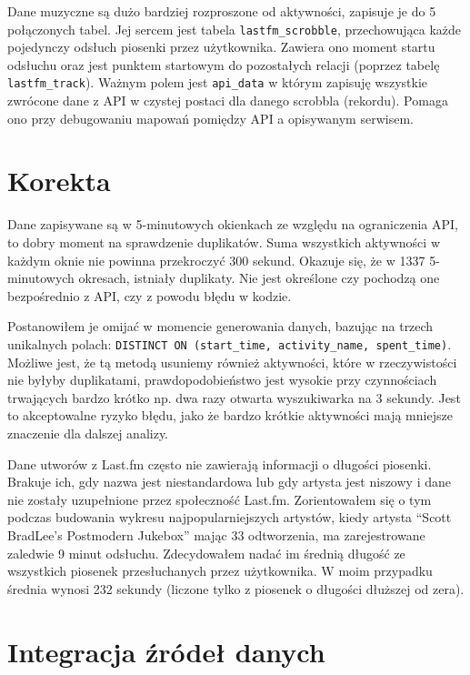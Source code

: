 \documentclass[brudnopis]{xmgr}
\begin{document}
    Dane muzyczne są dużo bardziej rozproszone od aktywności, zapisuje je do 5 połączonych tabel.
    Jej sercem jest tabela \verb|lastfm_scrobble|, przechowująca każde pojedynczy odsłuch piosenki przez użytkownika.
    Zawiera ono moment startu odsłuchu oraz jest punktem startowym do pozostałych relacji (poprzez tabelę \verb|lastfm_track|).
    Ważnym polem jest \verb|api_data| w którym zapisuję wszystkie zwrócone dane z API w czystej postaci dla danego scrobbla (rekordu).
    Pomaga ono przy debugowaniu mapowań pomiędzy API a opisywanym serwisem.

    \section{Korekta}

        Dane zapisywane są w 5-minutowych okienkach ze względu na ograniczenia API, to dobry moment na sprawdzenie duplikatów.
        Suma wszystkich aktywności w każdym oknie nie powinna przekroczyć 300 sekund.
        Okazuje się, że w 1337 5-minutowych okresach, istniały duplikaty.
        Nie jest określone czy pochodzą one bezpośrednio z API, czy z powodu błędu w kodzie.

        Postanowiłem je omijać w momencie generowania danych, bazując na trzech unikalnych polach:
        \verb|DISTINCT ON (start_time, activity_name, spent_time)|.
        Możliwe jest, że tą metodą usuniemy również aktywności, które w rzeczywistości nie byłyby duplikatami,
        prawdopodobieństwo jest wysokie przy czynnościach trwających bardzo krótko np. dwa razy otwarta wyszukiwarka na 3 sekundy.
        Jest to akceptowalne ryzyko błędu, jako że bardzo krótkie aktywności mają mniejsze znaczenie dla dalszej analizy.

        Dane utworów z Last.fm często nie zawierają informacji o długości piosenki.
        Brakuje ich, gdy nazwa jest niestandardowa lub gdy artysta jest niszowy i dane nie zostały uzupełnione przez społeczność Last.fm.
        Zorientowałem się o tym podczas budowania wykresu najpopularniejszych artystów,
        kiedy artysta ``Scott BradLee's Postmodern Jukebox'' mając 33 odtworzenia, ma zarejestrowane zaledwie 9 minut odsłuchu.
        Zdecydowałem nadać im średnią długość ze wszystkich piosenek przesłuchanych przez użytkownika.
        W moim przypadku średnia wynosi 232 sekundy (liczone tylko z piosenek o długości dłuższej od zera).

    \section{Integracja źródeł danych}
\end{document}
